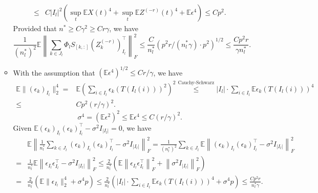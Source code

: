 \documentclass[11pt]{article}
\newcommand{\0}{{\mathbf{0}}}
\newcommand{\1}{{\mathbf{1}}}
\begin{document}
\begin{enumerate}[leftmargin=*]
\begin{itemize}[leftmargin=*]
\begin{equation*}
\begin{split}
		\leq & C|I_l|^2 \left(\sup_t \mathbb{E}X(t)^4 + \sup_t \mathbb{E}Z^{(-r)}(t)^4 +  \mathbb{E}\epsilon^4\right) \leq Cp^2.
		\end{split}
		\end{equation*}
		Provided that $n^\ast \geq C\gamma^2\geq Cr\gamma$, we have
		\begin{equation*}
		\frac{1}{(n_l^\ast)^2}\mathbb{E}\left\|\sum_{k \in J_l} \Phi_l S_{[k, :]}(Z_k^{(-r)})_{I_l}^\top\right\|_F^2\leq \frac{C}{n_l^\ast}\left(p^2r/(n_l^\ast\gamma) \cdot p^2\right)^{1/2} \leq \frac{Cp^2r}{\gamma n_l^\ast}.
		\end{equation*}
		\item With the assumption that $(\mathbb{E}\epsilon^4)^{1/2} \leq Cr/\gamma$, we have
		\begin{equation}\label{ineq:Eepsilon^4}
		\begin{split}
		\mathbb{E}\|(\epsilon_k)_{I_l}\|_2^4 = & \mathbb{E}\left(\sum_{i\in I_l} \epsilon_k(T(I_l(i)))^2 \right)^2 \overset{\text{Cauchy-Schwarz}}{\leq} |I_l|\cdot \sum_{i\in I_l} \mathbb{E}\epsilon_k(T(I_l(i)))^4 \\
		\leq & Cp^2 (r/\gamma)^2.
		\end{split}
		\end{equation}
		\begin{equation*}
		\sigma^4 = \left(\mathbb{E} \epsilon^2\right)^2 \leq \mathbb{E} \epsilon^4 \leq C(r/\gamma)^2.
		\end{equation*}
		Given $\mathbb{E}(\epsilon_k)_{I_l}(\epsilon_k)_{I_l}^\top - \sigma^2I_{|I_l|} = 0$, we have
		\begin{equation*}
		\begin{split}
		& \mathbb{E}\left\|\frac{1}{n_l^\ast}\sum_{k \in J_l} (\epsilon_k)_{I_l}(\epsilon_k)_{I_l}^\top - \sigma^2I_{|I_l|}\right\|_F^2 = \frac{1}{(n_l^\ast)^2} \sum_{k \in J_l} \mathbb{E}\left\|(\epsilon_k)_{I_l}(\epsilon_k)_{I_l}^\top - \sigma^2 I_{|I_l|}\right\|_F^2\\
		= & \frac{1}{n_l^\ast} \mathbb{E}\left\|\epsilon_{I_l}\epsilon_{I_l}^\top - \sigma^2 I_{|I_l|}\right\|_F^2 \leq \frac{2}{n_l^\ast} \left(\mathbb{E}\left\|\epsilon_{I_l}\epsilon_{I_l}^\top \right\|_F^2 + \left\|\sigma^2 I_{|I_l|}\right\|_F^2\right)\\ 
		= &  \frac{2}{n_l^\ast}\left(\mathbb{E}\|\epsilon_{I_l}\|_2^4 + \sigma^4 p\right) \leq \frac{2}{n_l^\ast} \left(|I_l|\cdot \sum_{i\in I_l} \mathbb{E} \epsilon_k(T(I_l(i)))^4 + \sigma^4 p \right) \leq \frac{Cp^2r}{n_l^\ast \gamma}.
		\end{split}

\end{equation*}
\end{itemize}
\end{enumerate}
\end{document}

